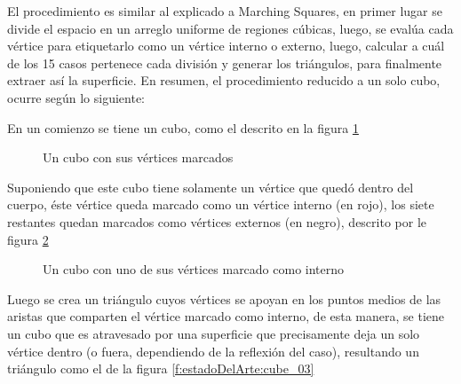 El procedimiento es similar al explicado a Marching Squares, en primer lugar se divide el
espacio en un arreglo uniforme de regiones cúbicas, luego, se evalúa cada vértice para etiquetarlo como un vértice interno o externo, luego, calcular a cuál de los 15 casos pertenece cada división y generar los triángulos, para finalmente extraer así la superficie.
En resumen, el procedimiento reducido a un solo cubo, ocurre según lo siguiente:

En un comienzo se tiene un cubo, como el descrito en la figura \ref{f:estadoDelArte:cube_01}

\begin{figure}[hbp]
\centering
\caption{Un cubo con sus vértices marcados}
\label{f:estadoDelArte:cube_01}
\end{figure}

Suponiendo que este cubo tiene solamente un vértice que quedó dentro del cuerpo, éste
vértice queda marcado como un vértice interno (en rojo), los siete restantes quedan marcados
como vértices externos (en negro), descrito por le figura \ref{f:estadoDelArte:cube_02}

\begin{figure}[hbp]
\centering
\caption{Un cubo con uno de sus vértices marcado como interno}
\label{f:estadoDelArte:cube_02}
\end{figure}

Luego se crea un triángulo cuyos vértices se apoyan en los puntos medios de las aristas
que comparten el vértice marcado como interno, de esta manera, se tiene un cubo que es
atravesado por una superficie que precisamente deja un solo vértice dentro (o fuera, dependiendo
de la reflexión del caso), resultando un triángulo como el de la figura \ref{f:estadoDelArte:cube_03}

